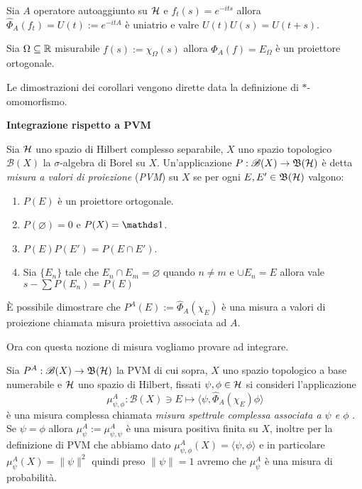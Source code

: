 \begin{corollary}
    Sia $A$ operatore autoaggiunto su $\operatorname{\mathcal{H}}$ e $f_t(s)= e^{-its}$ allora $\hat{\Phi}_A(f_t) = U(t) := e^{-itA}$ è uniatrio e valre $U(t)U(s) = U(t+s)$.
\end{corollary}

\begin{corollary}
    Sia $\Omega \subseteq \operatorname{\mathbb{R}}$ misurabile $f(s) := \chi_\Omega(s)$ allora $\hat{\Phi}_A(f) = E_\Omega$ è un proiettore ortogonale.
\end{corollary}

Le dimostrazioni dei corollari vengono dirette data la definizione di $*$-omomorfismo.

\textbf{Integrazione rispetto a PVM}

\begin{definition}
    Sia $\operatorname{\mathcal{H}}$ uno spazio di Hilbert complesso separabile, $X$ uno spazio topologico $\mathscr{B}(X)$ la $\sigma$-algebra di Borel su $X$. Un'applicazione $P: \mathscr{B}(X)\to \operatorname{\mathfrak{B}(\mathcal{H})}$ è detta \emph{misura a valori di proiezione} (\emph{PVM}) su $X$ se per ogni $E,E'\in \operatorname{\mathfrak{B}(\mathcal{H})}$ valgono:
\begin{enumerate}
    \item $P(E)$ è un proiettore ortogonale.
    \item $P({\varnothing})=0$ e $P(X)=\un$.
    \item $P(E)P(E')=P({E \cap E'})$.
    \item Sia $\{ E_n\} $ tale che $E_n \cap E_m = \varnothing$ quando $n \neq m$ e $\cup E_n = E$ allora vale $s-\sum P(E_n)=P(E)$
\end{enumerate}
\end{definition}

È possibile dimostrare che $P^A(E):=\hat{\Phi}_A(\chi_E)$ è una misura a valori di proiezione chiamata misura proiettiva associata ad $A$.

Ora con questa nozione di misura vogliamo provare ad integrare. 
\begin{theorem}
    Sia $P^A: \mathscr{B}(X)\to \operatorname{\mathfrak{B}(\mathcal{H})}$ la PVM di cui sopra, $X$ uno spazio topologico a base numerabile e $\operatorname{\mathcal{H}}$ uno spazio di Hilbert, fissati $\psi, \phi \in \operatorname{\mathcal{H}}$ si consideri l'applicazione $$\mu_{\psi,\phi}^A: \mathscr{B}(X) \ni E \mapsto \langle \psi , \hat{\Phi}_A(\chi_E) \phi\rangle$$ è una misura complessa chiamata \emph{misura spettrale complessa associata a $\psi$ e $\phi$ }. Se $\psi = \phi$ allora $\mu_\psi^A := \mu_{\psi,\psi}^A$ è una misura positiva finita su $X$, inoltre per la definizione di PVM che abbiamo dato $\mu_{\psi, \phi}^A(X)=\langle \psi, \phi\rangle$ e in particolare $\mu_\psi^A(X)=\| \psi\|^2$ quindi preso $\|\psi\|=1$ avremo che $\mu_\psi^A$ è una misura di probabilità. 
\end{theorem}

